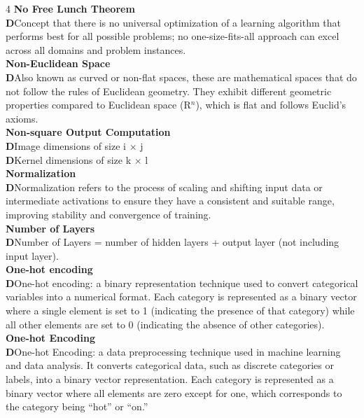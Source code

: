 \documentclass[8pt]{extarticle}
\newcommand{\dtag}{\textcolor{definitioncolor}{\tiny\textbf{D}}\;}
\begin{document}
\begin{multicols}{4}
\vspace{2pt}\textbf{No Free Lunch Theorem}\\
\dtag Concept that there is no universal optimization of a learning algorithm that performs best for all possible problems; no one-size-fits-all approach can excel across all domains and problem instances.\\
\vspace{2pt}\textbf{Non-Euclidean Space}\\
\dtag Also known as curved or non-flat spaces, these are mathematical spaces that do not follow the rules of Euclidean geometry. They exhibit different geometric properties compared to Euclidean space (R$^{n}$), which is flat and follows Euclid's axioms.\\
\vspace{2pt}\textbf{Non‑square Output Computation}\\
\dtag Image dimensions of size i $\times$ j\\
\dtag Kernel dimensions of size k $\times$ l\\
\vspace{2pt}\textbf{Normalization}\\
\dtag Normalization refers to the process of scaling and shifting input data or intermediate activations to ensure they have a consistent and suitable range, improving stability and convergence of training.\\
\vspace{2pt}\textbf{Number of Layers}\\
\dtag Number of Layers = number of hidden layers + output layer (not including input layer).\\
\vspace{2pt}\textbf{One-hot encoding}\\
\dtag One-hot encoding: a binary representation technique used to convert categorical variables into a numerical format. Each category is represented as a binary vector where a single element is set to 1 (indicating the presence of that category) while all other elements are set to 0 (indicating the absence of other categories).\\
\vspace{2pt}\textbf{One-hot Encoding}\\
\dtag One-hot Encoding: a data preprocessing technique used in machine learning and data analysis. It converts categorical data, such as discrete categories or labels, into a binary vector representation. Each category is represented as a binary vector where all elements are zero except for one, which corresponds to the category being ``hot'' or ``on.''\\

\end{multicols}
\end{document}
